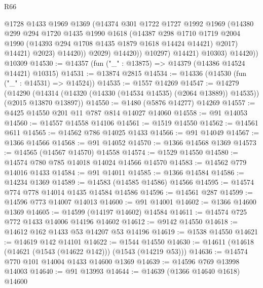 \begin{lexlean}{R66}
\begin{coremodule}
                        @1728
                        @1433
                        @1969
                        @1369
                        (@14374
                          @301
                          @1722
                          @1727
                          @1992
                          @1969
                          (@14380
                            @299
                            @294
                            @1720
                            @1435
                            @1990
                            @1618
                            (@14387
                              @298
                              @1710
                              @1719
                              @2004
                              @1990
                              (@14393 @294 @1708 @1435 @1879 @1618 @14424 @14421)
                              @2017)
                            @14421)
                          @2023)
                        @14420))
                    @2029)
                  @14420))
              @10297)
            @14421)
          @10303)
        @14420))
    @10309
@14530 := @14357 (fun ("_" : @13875) => @14379 (@14386 @14524 @14421) @10315)
@14531 := @13874 @2815
@14534 := @14336 (@14530 (fun ("_" : @14531) => @14524))
@14535 := @1557 @14269
@14547 := @14279
    (@14290 (@14314 (@14320 (@14330 (@14534 @14535) (@2064 @13889)) @14535)) (@2015 @13870 @13897))
@14550 := @1480 (@5876 @14277) @14269
@14557 := @4425 @14550 @201 @11 @787 @814 @14027 @14060
@14558 := @91 @14053
@14560 := @14557 @14558 @14106
@14561 := @1519 @14550
@14562 := @14561 @611
@14565 := @14562 @786 @14025 @1433
@14566 := @91 @14049
@14567 := @1366 @14566
@14568 := @91 @14052
@14570 := @1366 @14568 @1369
@14573 := @14565 (@14567 @14570) @14558
@14574 := @1529 @14550
@14580 := @14574 @780 @785 @14018 @14024 @14566 @14570
@14583 := @14562 @779 @14016 @1433
@14584 := @91 @14011
@14585 := @1366 @14584
@14586 := @14234 @1369
@14589 := @14583 (@14585 @14586) @14566
@14595 := @14574 @774 @778 @14014 @1435 @14584 @14586
@14596 := @14561 @287
@14599 := @14596 @773 @14007 @14013
@14600 := @91 @14001
@14602 := @1366 @14600 @1369
@14605 := @14599 (@14197 @14602) @14584
@14611 := @14574 @725 @772 @1433 @14006 @14196 @14602
@14612 := @9142 @14550
@14618 := @14612 @162 @1433 @53 @14207 @53 @14196
@14619 := @1538 @14550
@14621 := @14619 @142 @14101
@14622 := @1544 @14550
@14630 := @14611 (@14618 (@14621 (@1543 (@14622 @142))) (@1543 (@14219 @53)))
@14636 := @14574 @770 @101 @14004 @1433 @14600 @1369
@14639 := @14596 @769 @13998 @14003
@14640 := @91 @13993
@14644 := @14639 (@1366 @14640 @1618) @14600

\end{coremodule}
\end{lexlean}
